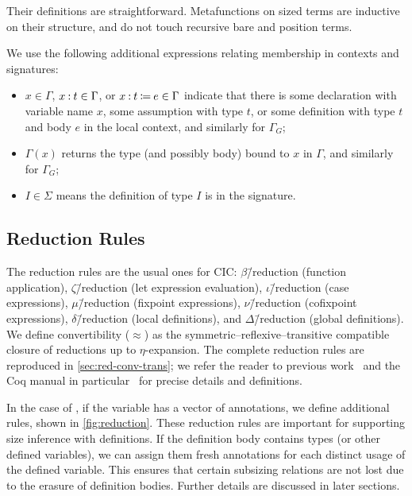 Their definitions are straightforward.
Metafunctions on sized terms are inductive on their structure, and do not touch recursive bare and position terms.

We use the following additional expressions relating membership in contexts and signatures:

\begin{itemize}
    \item $x \in \Gamma$, $x \mathbin{:} t \in \Gamma$, or $x \mathbin{:} t \mathbin{\coloneqq} e \in \Gamma$ indicate that there is some declaration with variable name $x$, some assumption with type $t$, or some definition with type $t$ and body $e$ in the local context, and similarly for $\Gamma_G$;
    \item $\Gamma(x)$ returns the type (and possibly body) bound to $x$ in $\Gamma$, and similarly for $\Gamma_G$;
    \item $I \in \Sigma$ means the \coinductive definition of type $I$ is in the signature.
\end{itemize}

\subsection{Reduction Rules}

The reduction rules are the usual ones for CIC: $\beta$\=/reduction (function application), $\zeta$\=/reduction (let expression evaluation), $\iota$\=/reduction (case expressions), $\mu$\=/reduction (fixpoint expressions), $\nu$\=/reduction (cofixpoint expressions), $\delta$\=/reduction (local definitions), and $\Delta$\=/reduction (global definitions).
We define convertibility ($\approx$) as the symmetric--reflexive--transitive compatible closure of reductions up to $\eta$-expansion.
The complete reduction rules are reproduced in \autoref{sec:red-conv-trans};
we refer the reader to previous work~\citep{cic-hat-minus, cic-hat, cc-hat-omega} and the Coq manual in particular~\citet{coq} for precise details and definitions.



In the case of \deltaDeltareduction, if the variable has a vector of annotations, we define additional rules, shown in \autoref{fig:reduction}.
These reduction rules are important for supporting size inference with definitions.
If the definition body contains \coinductive types (or other defined variables), we can assign them fresh annotations for each distinct usage of the defined variable.
This ensures that certain subsizing relations are not lost due to the erasure of definition bodies.
Further details are discussed in later sections.

